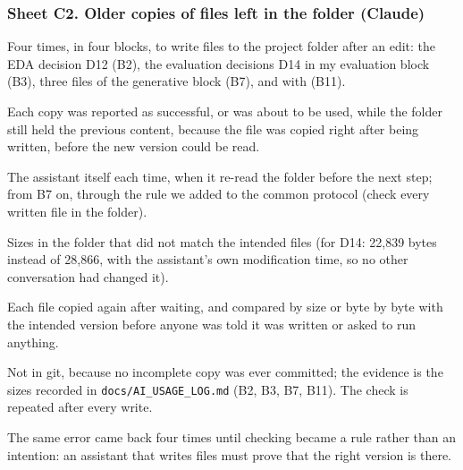 \subsubsection*{Sheet C2. Older copies of files left in the folder (Claude)}
\begin{description}[style=nextline,leftmargin=1.2em]
  \item[Prompt] Four times, in four blocks, to write files to the project folder after an edit: the EDA
        decision D12 (B2), the evaluation decisions D14 in my evaluation block (B3), three files of the
        generative block (B7), and  with  (B11).
  \item[Faulty response] Each copy was reported as successful, or was about to be used, while the folder
        still held the previous content, because the file was copied right after being written, before the
        new version could be read.
  \item[Detected by] The assistant itself each time, when it re-read the folder before the next step; from
        B7 on, through the rule we added to the common protocol (check every written file in the folder).
  \item[Proof] Sizes in the folder that did not match the intended files (for D14: 22,839 bytes instead of
        28,866, with the assistant's own modification time, so no other conversation had changed it).
  \item[Correction] Each file copied again after waiting, and compared by size or byte by byte with the
        intended version before anyone was told it was written or asked to run anything.
  \item[Reproduction] Not in git, because no incomplete copy was ever committed; the evidence is the sizes
        recorded in \texttt{docs/AI\_USAGE\_LOG.md} (B2, B3, B7, B11). The check is repeated after every write.
  \item[Reflection] The same error came back four times until checking became a rule rather than an
        intention: an assistant that writes files must prove that the right version is there.
\end{description}

